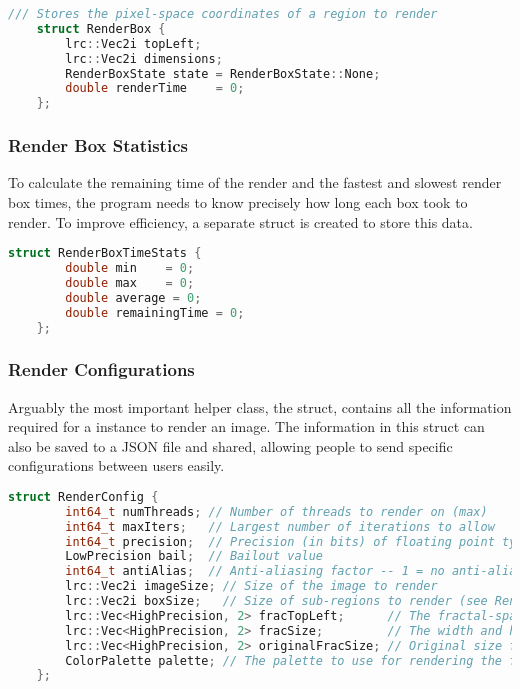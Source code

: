 \begin{lstlisting}[language=c++]
	/// Stores the pixel-space coordinates of a region to render
	struct RenderBox {
		lrc::Vec2i topLeft;
		lrc::Vec2i dimensions;
		RenderBoxState state = RenderBoxState::None;
		double renderTime	 = 0;
	};
\end{lstlisting}

\subsubsection{Render Box Statistics}

To calculate the remaining time of the render and the fastest and slowest render box times, the program needs to know precisely how long each box took to render. To improve efficiency, a separate struct is created to store this data.

\begin{lstlisting}[language=c++]
	struct RenderBoxTimeStats {
		double min	  = 0;
		double max	  = 0;
		double average = 0;
		double remainingTime = 0;
	};
\end{lstlisting}

\subsubsection{Render Configurations}

Arguably the most important helper class, the  struct, contains all the information required for a  instance to render an image. The information in this struct can also be saved to a JSON file and shared, allowing people to send specific configurations between users easily.

\begin{lstlisting}[language=c++]
	struct RenderConfig {
		int64_t numThreads; // Number of threads to render on (max)
		int64_t maxIters;	// Largest number of iterations to allow
		int64_t precision;	// Precision (in bits) of floating point types used for arithmetic
		LowPrecision bail;	// Bailout value
		int64_t antiAlias;	// Anti-aliasing factor -- 1 = no anti-aliasing
		lrc::Vec2i imageSize; // Size of the image to render
		lrc::Vec2i boxSize;	  // Size of sub-regions to render (see RenderBox)
		lrc::Vec<HighPrecision, 2> fracTopLeft;		 // The fractal-space center of the image
		lrc::Vec<HighPrecision, 2> fracSize;		 // The width and height of the fractal space
		lrc::Vec<HighPrecision, 2> originalFracSize; // Original size for zoom factor calculation
		ColorPalette palette; // The palette to use for rendering the fractal
	};
\end{lstlisting}

